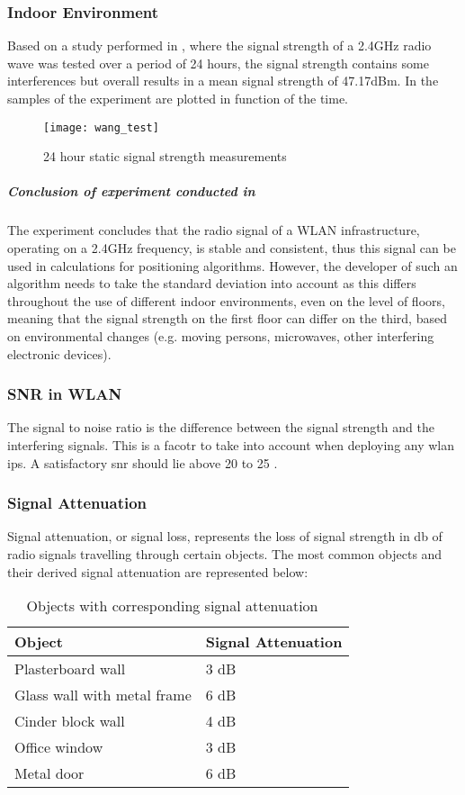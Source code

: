 \subsubsection{Indoor Environment}
Based on a study performed in \cite{Wang2003}, where the signal strength of a 2.4GHz radio wave was tested over a period of 24 hours, the signal strength contains some interferences but overall results in a mean signal strength of 47.17dBm. In \cite{fig:wang_test} the samples of the experiment are plotted in function of the time.
\begin{figure}[h!]
\centering
\texttt{[image: wang\_test]}
\caption{24 hour static signal strength measurements ~\cite{Wang2003}}
\label{fig:wang_test}
\end{figure}
\subparagraph{Conclusion of experiment conducted in ~\cite{Wang2003}}
The experiment concludes that the radio signal of a WLAN infrastructure, operating on a 2.4GHz frequency, is stable and consistent, thus this signal can be used in calculations for positioning algorithms. However, the developer of such an algorithm needs to take the standard deviation into account as this differs throughout the use of different indoor environments, even on the level of floors, meaning that the signal strength on the first floor can differ on the third, based on environmental changes (e.g. moving persons, microwaves, other interfering electronic devices).
\subsubsection{SNR in WLAN}
The signal to noise ratio is the difference between the signal strength and the interfering signals. This is a facotr to take into account when deploying any \acrshort{wlan} \acrlong{ips}. A satisfactory \acrlong{snr} should lie above 20 to 25 \cite{Hallock2015}.
\subsubsection{Signal Attenuation}
Signal attenuation, or signal loss, represents the loss of signal strength in \acrfull{db} of radio signals travelling through certain objects. The most common objects and their derived signal attenuation are represented below:
\begin{table}[]
\centering
\begin{tabular}{|l|l|}
\hline
\textbf{Object}             & \textbf{Signal Attenuation} \\ \hline
Plasterboard wall           & 3 dB                        \\ \hline
Glass wall with metal frame & 6 dB                        \\ \hline
Cinder block wall           & 4 dB                        \\ \hline
Office window               & 3 dB                        \\ \hline
Metal door                  & 6 dB                        \\ \hline
\end{tabular}
\caption{Objects with corresponding signal attenuation ~\cite[p.99]{Hallock2015}}
\end{table}
